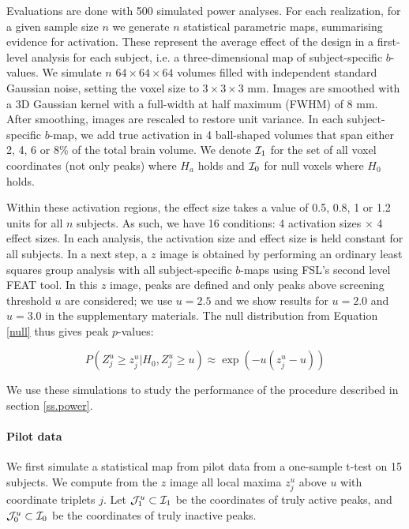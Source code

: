 Evaluations are done with 500 simulated power analyses.  For each realization, for a given sample size $n$ we generate $n$ statistical parametric maps, summarising evidence for activation.  These represent the average effect of the design in a first-level analysis for each subject, i.e. a three-dimensional map of subject-specific $b$-values.  We simulate $n$ $64 \times 64 \times 64$ volumes filled with independent standard Gaussian noise, setting the voxel size to $3 \times 3 \times 3$ mm. Images are smoothed with a 3D Gaussian kernel with a full-width at half maximum (FWHM) of $8$ mm.  After smoothing, images are rescaled to restore unit variance.  In each subject-specific $b$-map, we add true activation in 4 ball-shaped volumes that span either 2, 4, 6 or 8\% of the total brain volume.  We denote  ${\cal I}_1$ for the set of all voxel coordinates (not only peaks) where $H_a$ holds and ${\cal I}_0$ for null voxels where $H_0$ holds.

Within these activation regions, the effect size takes a value of {\color{Cyan}0.5, 0.8, 1 or 1.2} units for all $n$ subjects.  {\color{Cyan}As such, we have 16 conditions: 4 activation sizes $\times$ 4 effect sizes.  In each analysis, the activation size and effect size is held constant for all subjects.} In a next step, a $z$ image is obtained by performing an ordinary least squares group analysis  with all subject-specific $b$-maps using FSL's second level FEAT tool. In this $z$ image, peaks are defined and only peaks above screening threshold $u$ are considered; we use $u=2.5$ and we show results for $u=2.0$ and $u=3.0$ in the supplementary materials. The null distribution from Equation \ref{null} thus gives peak $p$-values:

\begin{equation}
P(Z^u_j \geq z^u_j | H_0, Z^u_j \geq u) \approx \exp{(-u(z^u_j-u))} \label{pvalues}
\end{equation}

We use these simulations to study the performance of the procedure described in section \ref{ss.power}.

\paragraph{Pilot data }We first simulate a statistical map from pilot data from a one-sample t-test on 15 subjects.  We compute from the $z$ image  all local maxima $z_j^u$ above $u$ with coordinate triplets $j$.  Let ${\cal J}_1^u \subset {\cal I}_1$ be the coordinates of truly active peaks, and ${\cal J}_0^u \subset {\cal I}_0$ be the coordinates of truly inactive peaks.

